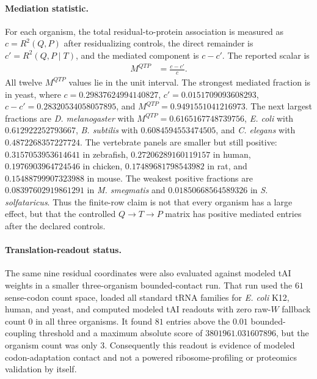 \paragraph{Mediation statistic.}
For each organism, the total residual-to-protein association is measured as $c=R^2(Q,P)$ after residualizing controls, the direct remainder is $c'=R^2(Q,P\mid T)$, and the mediated component is $c-c'$.  The reported scalar is
$$
\begin{aligned}
M^{QTP} &= \frac{c-c'}{c}.
\end{aligned}
$$
All twelve $M^{QTP}$ values lie in the unit interval.  The strongest mediated fraction is in yeast, where $c=0.29837624994140827$, $c'=0.0151709093608293$, $c-c'=0.28320534058057895$, and $M^{QTP}=0.9491551041216973$.  The next largest fractions are \emph{D. melanogaster} with $M^{QTP}=0.6165167748739756$, \emph{E. coli} with $0.612922252793667$, \emph{B. subtilis} with $0.6084594553474505$, and \emph{C. elegans} with $0.4872268357227724$.  The vertebrate panels are smaller but still positive: $0.3157053953614641$ in zebrafish, $0.27206289160119157$ in human, $0.1976903964724546$ in chicken, $0.17489681798543982$ in rat, and $0.15488799907323988$ in mouse.  The weakest positive fractions are $0.08397602919861291$ in \emph{M. smegmatis} and $0.01850668564589326$ in \emph{S. solfataricus}.  Thus the finite-row claim is not that every organism has a large effect, but that the controlled $Q\to T\to P$ matrix has positive mediated entries after the declared controls.

\paragraph{Translation-readout status.}
The same nine residual coordinates were also evaluated against modeled tAI weights in a smaller three-organism bounded-contact run.  That run used the $61$ sense-codon count space, loaded all standard tRNA families for \emph{E. coli} K12, human, and yeast, and computed modeled tAI readouts with zero raw-$W$ fallback count $0$ in all three organisms.  It found $81$ entries above the $0.01$ bounded-coupling threshold and a maximum absolute score of $3801961.031607896$, but the organism count was only $3$.  Consequently this readout is evidence of modeled codon-adaptation contact and not a powered ribosome-profiling or proteomics validation by itself.

